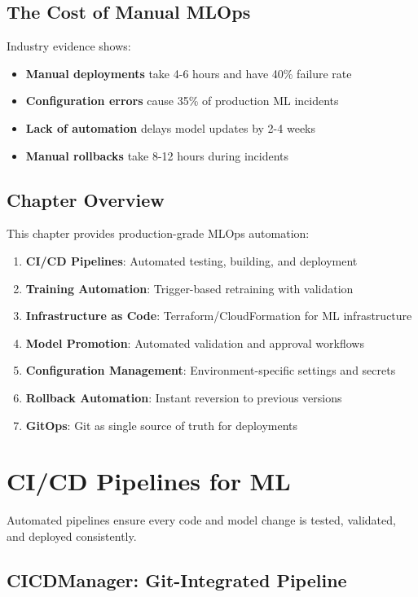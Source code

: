 \subsection{The Cost of Manual MLOps}

Industry evidence shows:
\begin{itemize}
    \item \textbf{Manual deployments} take 4-6 hours and have 40\% failure rate
    \item \textbf{Configuration errors} cause 35\% of production ML incidents
    \item \textbf{Lack of automation} delays model updates by 2-4 weeks
    \item \textbf{Manual rollbacks} take 8-12 hours during incidents
\end{itemize}

\subsection{Chapter Overview}

This chapter provides production-grade MLOps automation:

\begin{enumerate}
    \item \textbf{CI/CD Pipelines}: Automated testing, building, and deployment
    \item \textbf{Training Automation}: Trigger-based retraining with validation
    \item \textbf{Infrastructure as Code}: Terraform/CloudFormation for ML infrastructure
    \item \textbf{Model Promotion}: Automated validation and approval workflows
    \item \textbf{Configuration Management}: Environment-specific settings and secrets
    \item \textbf{Rollback Automation}: Instant reversion to previous versions
    \item \textbf{GitOps}: Git as single source of truth for deployments
\end{enumerate}

\section{CI/CD Pipelines for ML}

Automated pipelines ensure every code and model change is tested, validated, and deployed consistently.

\subsection{CICDManager: Git-Integrated Pipeline}

